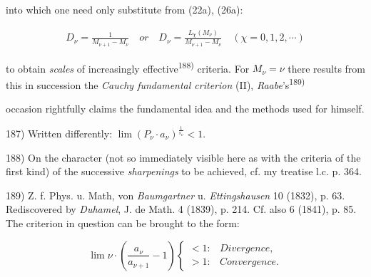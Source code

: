 into which one need only substitute from (22a), (26a):

\vspace{-0.5cm}
\begin{align}
    D_\nu = \frac{1}{M_{\nu+1} - M_\nu} \quad or \quad D_\nu = \frac{L_\chi(M_\nu)}{M_{\nu+1} - M_\nu} \quad (\chi = 0,1,2,\cdots)
\end{align}
\vspace{-0.3cm}

to obtain \textit{scales} of increasingly effective\textsuperscript{188)} criteria. For $M_\nu = \nu$ there results from this in succession the \textit{Cauchy fundamental criterion} (II), \textit{Raabe}'s\textsuperscript{189)}

\vfill
\leftline{\rule{2in}{0.4pt}}
\vspace{0.2cm}
{
\footnotesize
 occasion rightfully claims the fundamental idea and the methods used for himself.

187) Written differently: $\lim (P_\nu \cdot a_\nu)^{\frac{1}{s_\nu}} < 1$.

188) On the character (not so immediately visible here as with the criteria of the first kind) of the successive \textit{sharpenings} to be achieved, cf. my treatise l.c. p. 364.

189) Z. f. Phys. u. Math, von \textit{Baumgartner} u. \textit{Ettingshausen} 10 (1832), p. 63. Rediscovered by \textit{Duhamel}, J. de Math. 4 (1839), p. 214. Cf. also 6 (1841), p. 85. The criterion in question can be brought to the form: 

\vspace{-0.3cm}
$$\lim \nu \cdot (\frac{a_\nu}{a_{\nu+1}} - 1) \begin{cases} < 1: & \textit{Divergence}, \\ > 1: & \textit{Convergence}. \end{cases}$$
\vspace{-0.5cm}

}